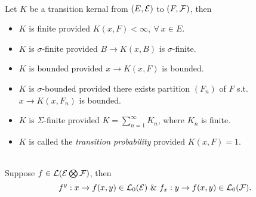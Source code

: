 \vspace{6pt}
\begin{definition}\ \\
Let $K$ be a transition kernal from $(E,\mathcal{E})$ to $(F,\mathcal{F})$, then
\begin{itemize}
    \item $K$ is finite provided $K(x,F) < \infty,\ \forall\ x \in E$.
    \item $K$ is $\sigma$-finite provided $B \to K(x,B)$ is $\sigma$-finite.
    \item $K$ is bounded provided $x \to K(x,F)$ is bounded.
    \item $K$ is $\sigma$-bounded provided there exists partition $(F_n)$ of $F$ s.t. $x \to K(x, F_n)$ is bounded.
    \item $K$ is $\Sigma$-finite provided $K = \sum_{n=1}^{\infty} K_n$, where $K_n$ is finite.
    \item $K$ is called the \textit{transition probability} provided $K(x,F) = 1$.
\end{itemize}
\end{definition}

\vspace{6pt}
\begin{lemma}\ \\
Suppose $f \in \mathcal{L}(\mathcal{E} \bigotimes \mathcal{F})$, then 
\begin{equation*}
    f^y: x \to f(x,y) \in \mathcal{L}_0(\mathcal{E})\ \&\ f_x: y \to f(x,y) \in \mathcal{L}_0(\mathcal{F}).
\end{equation*}
\end{lemma}

